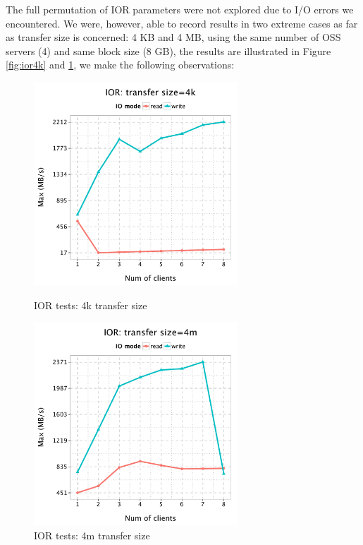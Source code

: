 \documentclass{article}
\begin{document}
The full permutation of IOR parameters were not explored due to I/O errors we encountered.
We were, however, able to record results in two extreme cases as far as
transfer size is concerned: 4 KB and 4 MB, using the same number of OSS servers
(4) and same block size (8 GB), the results are illustrated in Figure
\ref{fig:ior4k} and \ref{fig:ior4m}, we make the following observations:


\begin{figure}[H]
\centering
\begin{minipage}[t]{0.5\linewidth}
\centering
\includegraphics[width=3in]{data/ior_4k}
\caption{IOR tests: 4k transfer size}
\label{fig:ior4k}
\end{minipage}%
\begin{minipage}[t]{0.5\linewidth}
\centering
\includegraphics[width=3in]{data/ior_4m}
\caption{IOR tests: 4m transfer size}
\label{fig:ior4m}
\end{minipage}%
\end{figure}
\end{document}
